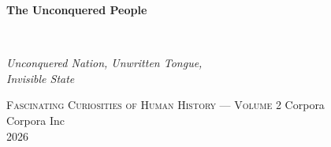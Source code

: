 \clearpage
\vspace*{1.5in}
\begin{center}
  \begin{minipage}{\textwidth}
    \centering
    \Huge\bfseries
    \linespread{1.25}\selectfont
    The Unconquered People
  \end{minipage}
  \\[3em]
  {\Large\itshape\linespread{1.3}\selectfont
  Unconquered Nation, Unwritten Tongue,\\
  Invisible State\par}
  \vspace{2em}
  {\small\scshape Fascinating Curiosities of Human History — Volume 2}
  \vfill
  {\large Corpora}
  \\[1em]
  {\large Corpora Inc}
  \\[1em]
  {\large 2026}
\end{center}
\clearpage
